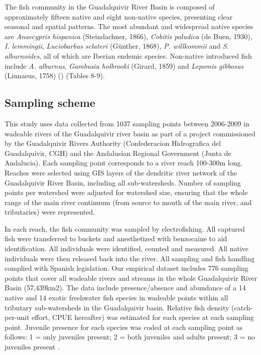 \documentclass[11pt,a4paper]{article}
\begin{document}
The fish community in the Guadalquivir River Basin is composed of approximately fifteen native and eight non-native species, presenting clear seasonal and spatial patterns. The most abundant and widespread native species are \textit{Anaecypris hispanica} (Steindachner, 1866), \textit{Cobitis paludica} (de Buen, 1930), \textit {I. lemmingii}, \textit{Luciobarbus sclateri} (Günther, 1868), \textit{P. willkommii} and \textit{S. alburnoides}, all of which are Iberian endemic species. Non-native introduced fish include \textit{A. alburnus}, \textit{Gambusia holbrooki} (Girard, 1859) and \textit{Lepomis gibbosus} (Linnaeus, 1758) (\cite{doi:10.1111/j.1095-8649.2001.tb01393.x,RAMOSMERCHANTE201845}) (Tables 8-9).

\subsection{Sampling scheme}
This study uses data collected from 1037 sampling points between 2006-2009 in wadeable rivers of the Guadalquivir river basin as part of a project commissioned by the Guadalquivir Rivers Authority (Confederacion Hidrografica del Guadalquivir, CGH) and the Andalusian Regional Government (Junta de Andalucia). Each sampling point corresponds to a river reach 100-300m long. Reaches were selected using GIS layers of the dendritic river network of the Guadalquivir River Basin, including all sub-watersheds. Number of sampling points per watershed were adjusted for watershed size, ensuring that the whole range of the main river continuum (from source to mouth of the main river, and tributaries) were represented.

In each reach, the fish community was sampled by electrofishing. All captured fish were transferred to buckets and anesthetized with benzocaine to aid identification. All individuals were identified, counted and measured. All native individuals were then released back into the river. All sampling and fish handling complied with Spanish legislation. Our empirical dataset includes 776 sampling points that cover all wadeable rivers and streams in the whole Guadalquivir River Basin (57,439km2). The data include presence/absence and abundance of a 14 native and 14 exotic freshwater fish species in wadeable points within all tributary sub-watersheds in the Guadalquivir basin. Relative fish density (catch-per-unit effort, CPUE hereafter) was estimated for each species at each sampling point. Juvenile presence for each species was coded at each sampling point as follows: 1 = only juveniles present; 2 = both juveniles and adults present; 3 = no juveniles present \cite{Matos2019}.
\end{document}
